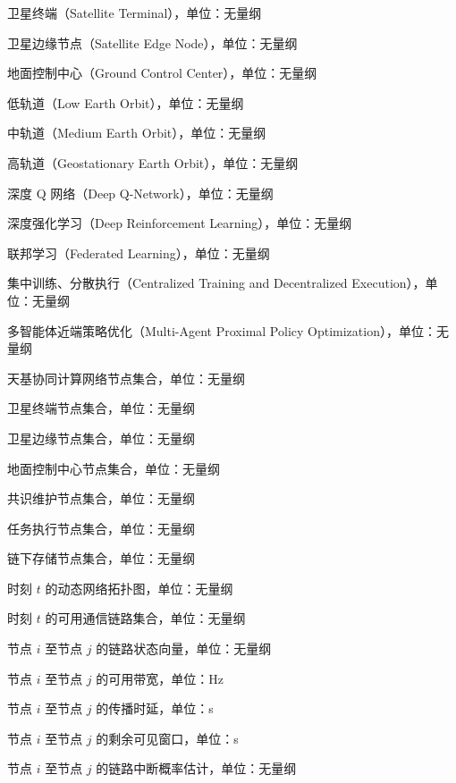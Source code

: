 
\begin{symbols}
  \item[$\mathrm{ST}$] 卫星终端（Satellite Terminal），单位：无量纲
  \item[$\mathrm{SEN}$] 卫星边缘节点（Satellite Edge Node），单位：无量纲
  \item[$\mathrm{CC}$] 地面控制中心（Ground Control Center），单位：无量纲
  \item[$\mathrm{LEO}$] 低轨道（Low Earth Orbit），单位：无量纲
  \item[$\mathrm{MEO}$] 中轨道（Medium Earth Orbit），单位：无量纲
  \item[$\mathrm{GEO}$] 高轨道（Geostationary Earth Orbit），单位：无量纲
  \item[$\mathrm{DQN}$] 深度 Q 网络（Deep Q-Network），单位：无量纲
  \item[$\mathrm{DRL}$] 深度强化学习（Deep Reinforcement Learning），单位：无量纲
  \item[$\mathrm{FL}$] 联邦学习（Federated Learning），单位：无量纲
  \item[$\mathrm{CTDE}$] 集中训练、分散执行（Centralized Training and Decentralized Execution），单位：无量纲
  \item[$\mathrm{MAPPO}$] 多智能体近端策略优化（Multi-Agent Proximal Policy Optimization），单位：无量纲

  \item[$\mathcal{V}$] 天基协同计算网络节点集合，单位：无量纲
  \item[$\mathcal{V}_{\mathrm{ST}}$] 卫星终端节点集合，单位：无量纲
  \item[$\mathcal{V}_{\mathrm{SEN}}$] 卫星边缘节点集合，单位：无量纲
  \item[$\mathcal{V}_{\mathrm{CC}}$] 地面控制中心节点集合，单位：无量纲
  \item[$\mathcal{V}_{\mathrm{con}}$] 共识维护节点集合，单位：无量纲
  \item[$\mathcal{V}_{\mathrm{exe}}$] 任务执行节点集合，单位：无量纲
  \item[$\mathcal{V}_{\mathrm{sto}}$] 链下存储节点集合，单位：无量纲
  \item[$\mathcal{G}(t)$] 时刻 $t$ 的动态网络拓扑图，单位：无量纲
  \item[$\mathcal{E}_{\mathrm{link}}(t)$] 时刻 $t$ 的可用通信链路集合，单位：无量纲
  \item[$\ell_{ij}(t)$] 节点 $i$ 至节点 $j$ 的链路状态向量，单位：无量纲
  \item[$B_{ij}(t)$] 节点 $i$ 至节点 $j$ 的可用带宽，单位：Hz
  \item[$d_{ij}^{\mathrm{prop}}(t)$] 节点 $i$ 至节点 $j$ 的传播时延，单位：s
  \item[$\tau_{ij}^{\mathrm{vis}}(t)$] 节点 $i$ 至节点 $j$ 的剩余可见窗口，单位：s
  \item[$p_{ij}^{\mathrm{loss}}(t)$] 节点 $i$ 至节点 $j$ 的链路中断概率估计，单位：无量纲


\end{symbols}
